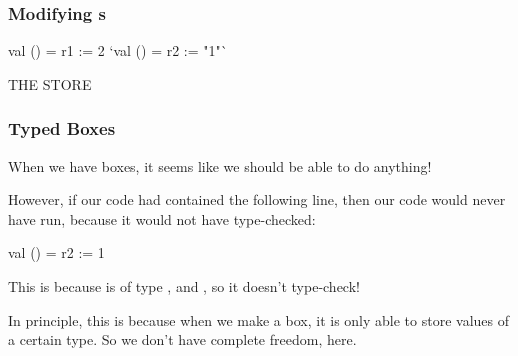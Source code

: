 \documentclass[aspectratio=169]{beamer}
\begin{document}
\begin{frame}[fragile]
  \frametitle{Modifying s}

  \begin{center}
    \begin{minipage}[t][2.5in][t]{0.55\textwidth}
      \vspace{\fill}
      \begin{codeblock}
        val () = r1 := 2
        `val () = r2 := "1"`
      \end{codeblock}
      \vspace{\fill}
    \end{minipage}
    \hfill\vline\hfill
    \begin{minipage}[t][2.5in][t]{0.35\textwidth}
      \centering
      {\hspace{-20pt}\color{gray} \large THE STORE}

      \vspace{\fill}
      \vspace{\fill}
    \end{minipage}
  \end{center}
\end{frame}

\begin{frame}[fragile]
  \frametitle{Typed Boxes}

  When we have boxes, it seems like we should be able to do anything!

  \pause
  \vspace{\fill}

  However, if our code had contained the following line, then our code
  would never have run, because it would not have type-checked:
  \begin{codeblock}
    val () = r2 := 1
  \end{codeblock}

  \pause
  \vspace{\fill}

  This is because  is of type , and
  , so it doesn't type-check!

  \pause
  \vspace{\fill}

  In principle, this is because when we make a box, it is only able to store
  values of a certain type. So we don't have complete freedom, here.
\end{frame}
\end{document}
